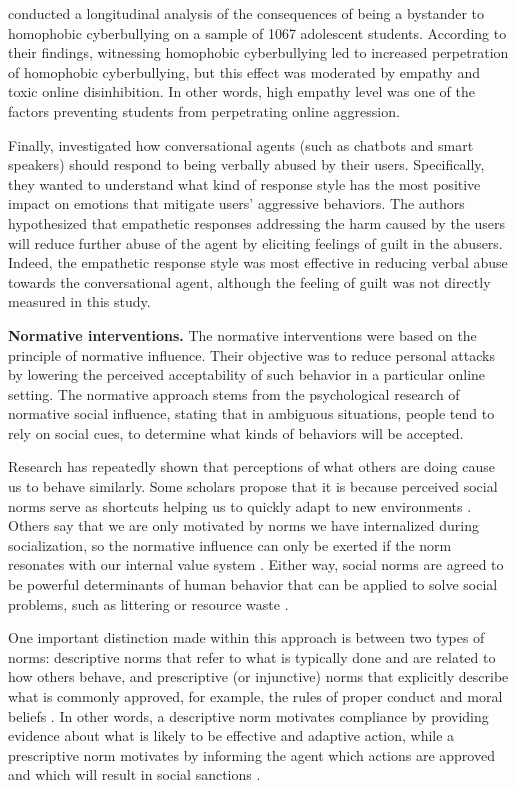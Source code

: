 \documentclass[preprint,12pt]{elsarticle}
\begin{document}
 \citet{wright2021does} conducted a longitudinal analysis of the consequences of being a bystander to homophobic cyberbullying on a sample of 1067 adolescent students. According to their findings, witnessing homophobic cyberbullying led to increased perpetration of homophobic cyberbullying, but this effect was moderated by empathy and toxic online disinhibition. In other words, high empathy level was one of the factors preventing students from perpetrating online aggression.

Finally, \citet{chin2020empathy} investigated how conversational agents (such as chatbots and smart speakers) should respond to being verbally abused by their users. Specifically, they wanted to understand what kind of response style has the most positive impact on emotions that mitigate users’ aggressive behaviors. The authors hypothesized that empathetic responses addressing the harm caused by the users will reduce further abuse of the agent by eliciting feelings of guilt in the abusers. Indeed, the empathetic response style was most effective in reducing verbal abuse towards the conversational agent, although the feeling of guilt was not directly measured in this study. 

\textbf{Normative interventions.} The normative interventions were based on the principle of normative influence. Their objective was to reduce personal attacks by lowering the perceived acceptability of such behavior in a particular online setting. The normative approach stems from the psychological research of normative social influence, stating that in ambiguous situations, people tend to rely on social cues, to determine what kinds of behaviors will be accepted.

Research has repeatedly shown that perceptions of what others are doing cause us to behave similarly. Some scholars propose that it is because perceived social norms serve as shortcuts helping us to quickly adapt to new environments \citep{cialdini1990focus}. Others say that we are only motivated by norms we have internalized during socialization, so the normative influence can only be exerted if the norm resonates with our internal value system \citep{morris2018common}. Either way, social norms are agreed to be powerful determinants of human behavior that can be applied to solve social problems, such as littering or resource waste \citep{cialdini2006managing, cialdini1990focus, goldstein2008room, morris2018common}. 

One important distinction made within this approach is between two types of norms: 
descriptive norms that refer to what is typically done and are related to  how others behave, and prescriptive (or injunctive) norms that explicitly describe what is commonly approved, for example, the rules of proper conduct and moral beliefs \citep{cialdini1990focus}. In other words, a descriptive norm motivates compliance by providing evidence about what is likely to be effective and adaptive action, while a prescriptive  norm motivates by informing the agent which actions are approved and which will result in social sanctions \citep{yanowitzky2006communication, cialdini2004social, kallgren2000focus}. 
\end{document}
